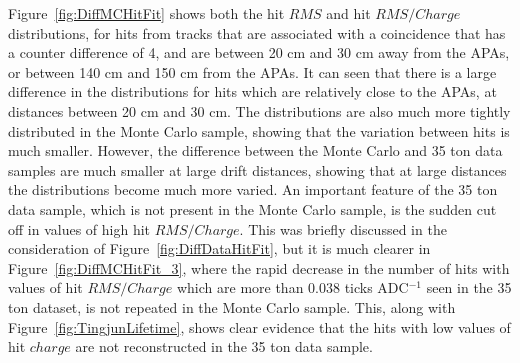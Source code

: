 Figure~\ref{fig:DiffMCHitFit} shows both the hit $RMS$ and hit $RMS/Charge$ distributions, for hits from tracks that are associated with a coincidence that has a counter difference of 4, and are between 20 cm and 30 cm away from the APAs, or between 140 cm and 150 cm from the APAs. It can seen that there is a large difference in the distributions for hits which are relatively close to the APAs, at distances between 20 cm and 30 cm. The distributions are also much more tightly distributed in the Monte Carlo sample, showing that the variation between hits is much smaller. However, the difference between the Monte Carlo and 35 ton data samples are much smaller at large drift distances, showing that at large distances the distributions become much more varied. An important feature of the 35 ton data sample, which is not present in the Monte Carlo sample, is the sudden cut off in values of high hit $RMS/Charge$. This was briefly discussed in the consideration of Figure~\ref{fig:DiffDataHitFit}, but it is much clearer in Figure~\ref{fig:DiffMCHitFit_3}, where the rapid decrease in the number of hits with values of hit $RMS/Charge$ which are more than 0.038 ticks ADC$^{-1}$ seen in the 35 ton dataset, is not repeated in the Monte Carlo sample. This, along with Figure~\ref{fig:TingjunLifetime}, shows clear evidence that the hits with low values of hit $charge$ are not reconstructed in the 35 ton data sample. \\  

